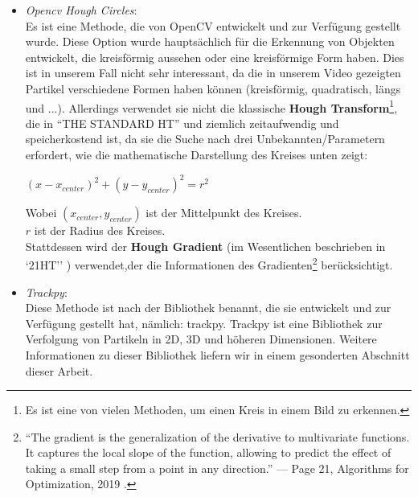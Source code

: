 \begin{itemize}
   \item \textit{Opencv Hough Circles}:\\ Es ist eine Methode, die von OpenCV\cite{opencv_library} entwickelt und zur Verfügung gestellt wurde. Diese Option wurde hauptsächlich für die Erkennung von Objekten entwickelt, die kreisförmig aussehen oder eine kreisförmige Form haben. Dies ist in unserem Fall nicht sehr interessant, da die in unserem Video gezeigten Partikel verschiedene Formen haben können (kreisförmig, quadratisch, längs und ...). Allerdings verwendet sie nicht die klassische \textbf{Hough Transform}\footnote{Es ist eine von vielen Methoden, um einen Kreis in einem Bild zu erkennen.}, die in ``THE STANDARD HT'' \cite{comparative_hough_transform} und ziemlich zeitaufwendig und speicherkostend ist, da sie die Suche nach drei Unbekannten/Parametern erfordert, wie die mathematische Darstellung des Kreises unten zeigt:\\
\begin{center}
 $ (x- x_{center})^{2} + (y - y_{center})^{2} = r^{2}$ \\
\end{center}
Wobei $(x_{center},y_{center})$ ist der Mittelpunkt des Kreises.\\
      $r$ ist der Radius des Kreises.\\
      

Stattdessen wird der \textbf{Hough Gradient} (im Wesentlichen beschrieben in `21HT'' \cite{comparative_hough_transform}) verwendet,der die Informationen des Gradienten\footnote{``The gradient is the generalization of the derivative to multivariate functions. It captures the local slope of the function, allowing to predict the effect of taking a small step from a point in any direction.'' — Page 21, Algorithms for Optimization, 2019 \cite{algo_optimi_2019}.} berücksichtigt.
      
   \item \textit{Trackpy}:\\ Diese Methode ist nach der Bibliothek benannt, die sie entwickelt und zur Verfügung gestellt hat, nämlich: trackpy.  Trackpy ist eine Bibliothek zur Verfolgung von Partikeln in 2D, 3D und höheren Dimensionen. Weitere Informationen zu dieser Bibliothek liefern wir in einem gesonderten Abschnitt dieser Arbeit.
   

\end{itemize}

